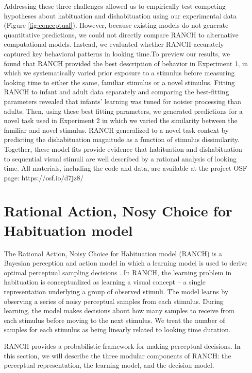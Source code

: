 \documentclass[
]{article}
\begin{document}
Addressing these three challenges allowed us to empirically test competing hypotheses about habituation and dishabituation using our experimental data (Figure \ref{fig:conceptual}). However, because existing models do not generate quantitative predictions, we could not directly compare RANCH to alternative computational models. Instead, we evaluated whether RANCH accurately captured key behavioral patterns in looking time.To preview our results, we found that RANCH provided the best description of behavior in Experiment 1, in which we systematically varied prior exposure to a stimulus before measuring looking time to either the same, familiar stimulus or a novel stimulus. Fitting RANCH to infant and adult data separately and comparing the best-fitting parameters revealed that infants' learning was tuned for noisier processing than adults. Then, using these best fitting parameters, we generated predictions for a novel task used in Experiment 2 in which we varied the similarity between the familiar and novel stimulus. RANCH generalized to a novel task context by predicting the dishabituation magnitude as a function of stimulus dissimilarity. Together, these model fits provide evidence that habituation and dishabituation to sequential visual stimuli are well described by a rational analysis of looking time. All materials, including the code and data, are available at the project OSF page: https://osf.io/d7jz8/

\hypertarget{rational-action-nosy-choice-for-habituation-model}{%
\section{Rational Action, Nosy Choice for Habituation model}\label{rational-action-nosy-choice-for-habituation-model}}

The Rational Action, Noisy Choice for Habituation model (RANCH) is a Bayesian perception and action model in which a learning model is used to derive optimal perceptual sampling decisions \autocite{cao2023habituation}. In RANCH, the learning problem in habituation is conceptualized as learning a visual concept -- a single representation underlying a group of observed stimuli. The model learns by observing a series of noisy perceptual samples from each stimulus. During learning, the model makes decisions about how many samples to receive from each stimulus before moving to the next stimulus. We treat the number of samples for each stimulus as being linearly related to looking time duration.

RANCH provides a probabilistic framework for making perceptual decisions. In this section, we will describe the three modular components of RANCH: the perceptual representation, the learning model, and the decision model.
\end{document}
